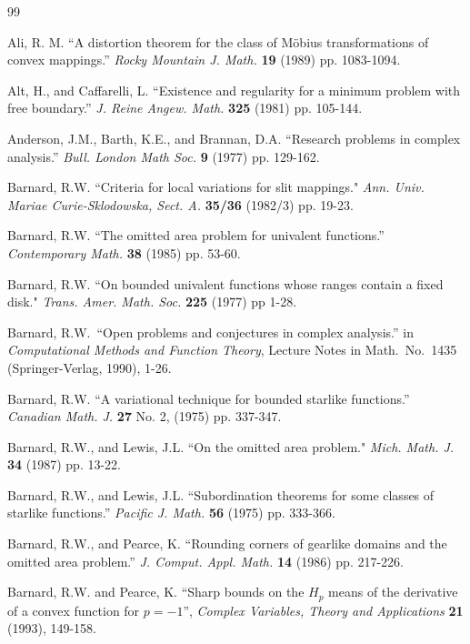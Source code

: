 \documentclass[final]{siamltex}
\begin{document}
\begin{thebibliography}{99}

 Ali, R. M. ``A distortion theorem for the class of M\"{o}bius 
transformations of convex mappings.'' {\em Rocky Mountain J. Math.} {\bf 19}
(1989) pp. 1083-1094.

 Alt, H., and Caffarelli, L.  ``Existence and
regularity for a minimum problem with free boundary.''  {\em J. Reine
Angew. Math.} {\bf 325} (1981) pp. 105-144.

 Anderson, J.M., Barth, K.E., and Brannan, D.A.
``Research problems in complex analysis.''  {\em Bull. London Math
Soc.}  {\bf 9} (1977) pp. 129-162.

 Barnard, R.W. ``Criteria for local variations for slit 
mappings." {\em Ann. Univ. Mariae Curie-Sklodowska, Sect. A.} {\bf 35/36} (1982/3)
pp. 19-23.

 Barnard, R.W.  ``The omitted area problem for
univalent functions.''  {\em Contemporary Math.} {\bf 38} (1985) pp.
53-60.

 Barnard, R.W. ``On bounded univalent functions whose ranges contain
a fixed disk." {\em Trans. Amer. Math. Soc.} {\bf 225} (1977) pp 1-28.

 Barnard, R.W.\ ``Open problems and conjectures in
complex analysis.'' in {\em Computational Methods and Function
Theory}, Lecture Notes in Math.\ No.\ 1435 (Springer-Verlag, 1990),
1-26.

 Barnard, R.W.  ``A variational technique for bounded
starlike functions.''  {\em Canadian Math. J.}  {\bf 27} No. 2,
(1975) pp. 337-347.

 Barnard, R.W., and Lewis, J.L. ``On the omitted area problem."
{\em Mich. Math. J.} {\bf 34} (1987) pp. 13-22.

 Barnard, R.W., and Lewis, J.L.  ``Subordination
theorems for some classes of starlike functions.''  {\em Pacific J.
Math.}  {\bf 56} (1975) pp. 333-366.

 Barnard, R.W., and Pearce, K.  ``Rounding corners of
gearlike domains and the omitted area problem.''  {\em J.
Comput. Appl. Math.}  {\bf 14} (1986) pp. 217-226.

 Barnard, R.W. and Pearce, K. ``Sharp bounds on the
$H_p$ means of the derivative of a convex function for $p=-1$'', {\em
Complex Variables, Theory and Applications} {\bf 21} (1993), 149-158.


\end{thebibliography}
\end{document}
